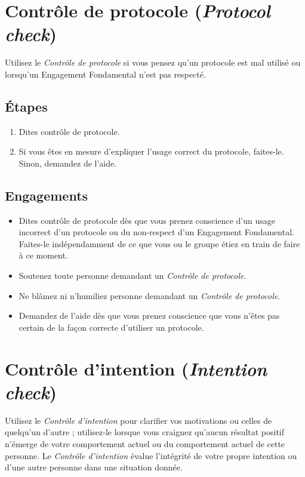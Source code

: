 \documentclass[11pt]{book}
\let\oldsection\section
\renewcommand\section{\clearpage\oldsection}
\begin{document}
\section{Contrôle de protocole (\emph{Protocol check})}

Utilisez le \emph{Contrôle de protocole} si vous pensez qu'un protocole est mal utilisé ou lorsqu'un Engagement Fondamental n'est pas
respecté.

\subsection{Étapes}
\begin{enumerate}
	\item Dites \og{}contrôle de protocole\fg{}.
	\item Si vous êtes en mesure d'expliquer l'usage correct du protocole, faites-le. Sinon, demandez de l'aide.
\end{enumerate}

\subsection{Engagements}
\begin{itemize}
	\item Dites \og{}contrôle de protocole\fg{} dès que vous prenez conscience d'un usage incorrect d'un protocole ou du non-respect
	      d'un Engagement Fondamental. Faites-le indépendamment de ce que vous ou le groupe étiez en train de faire à ce moment.
	\item Soutenez toute personne demandant un \emph{Contrôle de protocole}.
	\item Ne blâmez ni n'humiliez personne demandant un \emph{Contrôle de protocole}.
	\item Demandez de l'aide dès que vous prenez conscience que vous n'êtes pas certain de la façon correcte d'utiliser un protocole.
\end{itemize}

\section{Contrôle d'intention (\emph{Intention check})}

Utilisez le \emph{Contrôle d'intention} pour clarifier vos motivations ou celles de quelqu'un d'autre ; utilisez-le lorsque vous
craignez qu'aucun résultat positif n'émerge de votre comportement actuel ou du comportement actuel de cette personne. Le
\emph{Contrôle d'intention} évalue l'intégrité de votre propre intention ou d'une autre personne dans une situation donnée.
\end{document}
